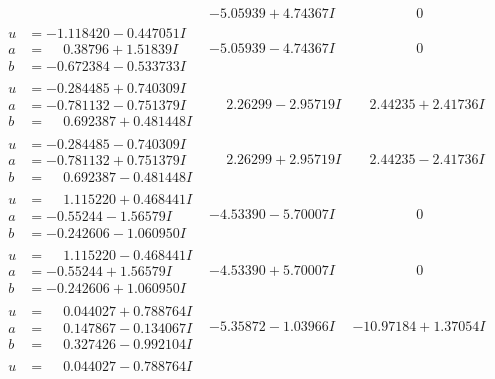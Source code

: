 \documentclass[1p]{elsarticle_modified}
\theoremstyle{definition}
\begin{document}
$$\begin{array}{c|c|c}
 & -5.05939 + 4.74367 I & \phantom{-0.000000 } 0 \\ \hline\begin{aligned}
u &= -1.118420 - 0.447051 I \\
a &= \phantom{-}0.38796 + 1.51839 I \\
b &= -0.672384 - 0.533733 I\end{aligned}
 & -5.05939 - 4.74367 I & \phantom{-0.000000 } 0 \\ \hline\begin{aligned}
u &= -0.284485 + 0.740309 I \\
a &= -0.781132 - 0.751379 I \\
b &= \phantom{-}0.692387 + 0.481448 I\end{aligned}
 & \phantom{-}2.26299 - 2.95719 I & \phantom{-}2.44235 + 2.41736 I \\ \hline\begin{aligned}
u &= -0.284485 - 0.740309 I \\
a &= -0.781132 + 0.751379 I \\
b &= \phantom{-}0.692387 - 0.481448 I\end{aligned}
 & \phantom{-}2.26299 + 2.95719 I & \phantom{-}2.44235 - 2.41736 I \\ \hline\begin{aligned}
u &= \phantom{-}1.115220 + 0.468441 I \\
a &= -0.55244 - 1.56579 I \\
b &= -0.242606 - 1.060950 I\end{aligned}
 & -4.53390 - 5.70007 I & \phantom{-0.000000 } 0 \\ \hline\begin{aligned}
u &= \phantom{-}1.115220 - 0.468441 I \\
a &= -0.55244 + 1.56579 I \\
b &= -0.242606 + 1.060950 I\end{aligned}
 & -4.53390 + 5.70007 I & \phantom{-0.000000 } 0 \\ \hline\begin{aligned}
u &= \phantom{-}0.044027 + 0.788764 I \\
a &= \phantom{-}0.147867 - 0.134067 I \\
b &= \phantom{-}0.327426 - 0.992104 I\end{aligned}
 & -5.35872 - 1.03966 I & -10.97184 + 1.37054 I \\ \hline\begin{aligned}
u &= \phantom{-}0.044027 - 0.788764 I \\

\end{aligned}
\end{array}$$
\end{document}
